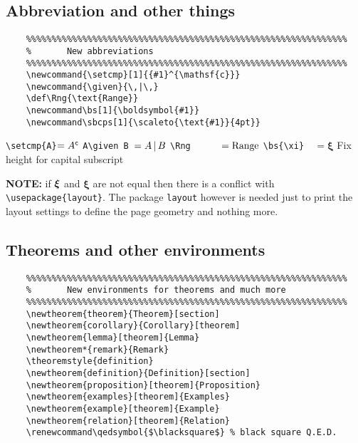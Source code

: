\documentclass{article}
\begin{document}
\subsection{Abbreviation and other things}
\begin{minipage}[t]{0.78\textwidth}
    \begin{verbatim}
    %%%%%%%%%%%%%%%%%%%%%%%%%%%%%%%%%%%%%%%%%%%%%%%%%%%%%%%%%%%%%%%
    %       New abbreviations
    %%%%%%%%%%%%%%%%%%%%%%%%%%%%%%%%%%%%%%%%%%%%%%%%%%%%%%%%%%%%%%%
    \newcommand{\setcmp}[1]{{#1}^{\mathsf{c}}}
    \newcommand{\given}{\,|\,}
    \def\Rng{\text{Range}}
    \newcommand\bs[1]{\boldsymbol{#1}}
    \newcommand\sbcps[1]{\scaleto{\text{#1}}{4pt}}
    \end{verbatim}
\end{minipage}
\begin{minipage}[t]{0.28\textwidth}
    \null\null\null
    \verb!\setcmp{A}!$=\setcmp{A}$\newline
    \verb!A\given B !$=A\given B$\newline
    \verb!\Rng      !$=\Rng$\newline
    \verb!\bs{\xi}  !$=\boldsymbol{\xi}$\newline 
    Fix height for capital subscript
\end{minipage}
{\color{red}\textbf{NOTE:} if $\bs{\xi}$ and $\boldsymbol{\xi}$ are not equal  then there is a conflict with \verb!\usepackage{layout}!. The package \texttt{layout} however is needed just to print the layout settings to define the page geometry and nothing more.}
\subsection{Theorems and other environments}
\begin{verbatim}
    %%%%%%%%%%%%%%%%%%%%%%%%%%%%%%%%%%%%%%%%%%%%%%%%%%%%%%%%%%%%%%%
    %       New environments for theorems and much more
    %%%%%%%%%%%%%%%%%%%%%%%%%%%%%%%%%%%%%%%%%%%%%%%%%%%%%%%%%%%%%%%
    \newtheorem{theorem}{Theorem}[section]
    \newtheorem{corollary}{Corollary}[theorem]
    \newtheorem{lemma}[theorem]{Lemma}
    \newtheorem*{remark}{Remark}
    \theoremstyle{definition}
    \newtheorem{definition}{Definition}[section]
    \newtheorem{proposition}[theorem]{Proposition}
    \newtheorem{examples}[theorem]{Examples}
    \newtheorem{example}[theorem]{Example}
    \newtheorem{relation}[theorem]{Relation}
    \renewcommand\qedsymbol{$\blacksquare$} % black square Q.E.D.
\end{verbatim}
\end{document}
